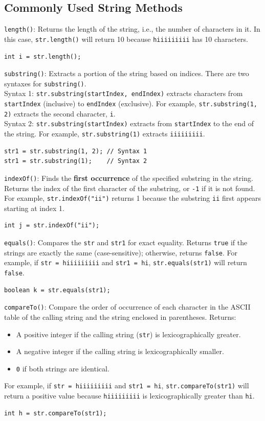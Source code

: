 \documentclass[letterpaper,12pt]{article}
\begin{document}
\subsection{Commonly Used String Methods}
\texttt{length()}: Returns the length of the string, i.e., the number of characters in it. In this case, \texttt{str.length()} will return 10 because \texttt{hiiiiiiiii} has 10 characters.
\begin{verbatim}
int i = str.length();
\end{verbatim}
\texttt{substring()}: Extracts a portion of the string based on indices. There are two syntaxes for \texttt{substring()}.\\
Syntax 1: \texttt{str.substring(startIndex, endIndex)} extracts characters from \texttt{startIndex} (inclusive) to \texttt{endIndex} (exclusive). For example, \texttt{str.substring(1, 2)} extracts the second character, \texttt{i}.\\
Syntax 2: \texttt{str.substring(startIndex)} extracts from \texttt{startIndex} to the end of the string. For example, \texttt{str.substring(1)} extracts \texttt{iiiiiiiii}.
\begin{verbatim}
str1 = str.substring(1, 2); // Syntax 1
str1 = str.substring(1);    // Syntax 2
\end{verbatim}
\texttt{indexOf()}: Finds the \textbf{first occurrence} of the specified substring in the string. Returns the index of the first character of the substring, or \texttt{-1} if it is not found. For example, \texttt{str.indexOf("ii")} returns 1 because the substring \texttt{ii} first appears starting at index 1.
\begin{verbatim}
int j = str.indexOf("ii");
\end{verbatim}
\texttt{equals()}: Compares the \texttt{str} and \texttt{str1} for exact equality. Returns \texttt{true} if the strings are exactly the same (case-sensitive); otherwise, returns \texttt{false}. For example, if \texttt{str = hiiiiiiiii} and \texttt{str1 = hi}, \texttt{str.equals(str1)} will return \texttt{false}.
\begin{verbatim}
boolean k = str.equals(str1);
\end{verbatim}
\texttt{compareTo()}: Compare the order of occurrence of each character in the ASCII table of the calling string and the string enclosed in parentheses. Returns:
\begin{itemize}
    \item A positive integer if the calling string (\texttt{str}) is lexicographically greater.
    \item A negative integer if the calling string is lexicographically smaller.
    \item \texttt{0} if both strings are identical.
\end{itemize}
For example, if \texttt{str = hiiiiiiiii} and \texttt{str1 = hi}, \texttt{str.compareTo(str1)} will return a positive value because \texttt{hiiiiiiiii} is lexicographically greater than \texttt{hi}.
\begin{verbatim}
int h = str.compareTo(str1);
\end{verbatim}
\end{document}
